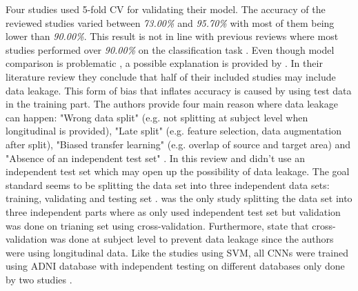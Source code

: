 Four studies used 5-fold CV for validating their model. The accuracy of the reviewed studies varied between \textit{73.00\%} and \textit{95.70\%} with most of them being lower than \textit{90.00\%}. This result is not in line with previous reviews where most studies performed over \textit{90.00\%} on the classification task \autocite{ebrahimighahnaviehDeepLearningDetect2020, tanveerMachineLearningTechniques2020, joDeepLearningAlzheimer2019}. Even though model comparison is problematic \autocite{bron}, a possible explanation is provided by \textcite{wenConvolutionalNeuralNetworks2020}. In their literature review they conclude that half of their included studies may include data leakage. This form of bias that inflates accuracy is caused by using test data in the training part. The authors provide four main reason where data leakage can happen: "Wrong data split" (e.g. not splitting at subject level when longitudinal is provided),  "Late split" (e.g. feature selection, data augmentation after split), "Biased transfer learning" (e.g. overlap of source and target area) and "Absence of an independent test set" \autocite[][p. 4]{wenConvolutionalNeuralNetworks2020}. In this review \textcite{wangDenseCNNDenselyConnected2021} and \textcite{nanniComparisonTransferLearning2020} didn't use an independent test set which may open up the possibility of data leakage. The goal standard seems to be splitting the data set into three independent data sets: training, validating and testing set \autocite{introtostat, wenConvolutionalNeuralNetworks2020}. \textcite{wenConvolutionalNeuralNetworks2020} was the only study splitting the data set into three independent parts where as \textcite{yeeConstructionMRIBasedAlzheimer2021, liuMultimodelDeepConvolutional2020a} only used independent test set but validation was done on trianing set using cross-validation. Furthermore, \textcite{yeeConstructionMRIBasedAlzheimer2021} state that cross-validation was done at subject level to prevent data leakage since the authors were using longitudinal data. 
Like the studies using SVM, all CNNs were trained using ADNI database with independent testing on different databases only done by two studies \autocite[e.g.][]{wenConvolutionalNeuralNetworks2020,yeeConstructionMRIBasedAlzheimer2021}.   


